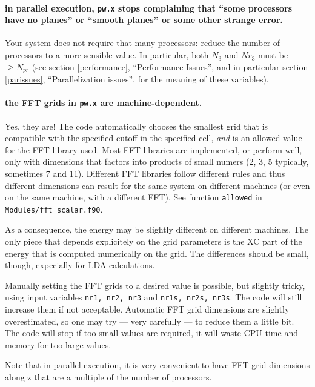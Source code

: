 \documentclass[12pt,a4paper]{article}
\begin{document}
\paragraph{in parallel execution, \texttt{pw.x} stops complaining that
           ``some processors have no planes'' or ``smooth planes'' or
           some other strange error.}

Your system does not require that many processors: reduce the number
of processors to a more sensible value.
In particular, both $N_3$ and $Nr_3$ must be $\geq N_{pr}$ (see
section \ref{performance}, ``Performance Issues'', and in particular
section \ref{parissues}, ``Parallelization issues'', for the meaning
of these variables).

\paragraph{the FFT grids in \texttt{pw.x} are machine-dependent.}

Yes, they are!
The code automatically chooses the smallest grid that is compatible
with the specified cutoff in the specified cell, \emph{and} is an
allowed value for the FFT library used.
Most FFT libraries are implemented, or perform well, only with
dimensions that factors into products of small numers (2, 3, 5
typically, sometimes 7 and 11).
Different FFT libraries follow different rules and thus different
dimensions can result for the same system on different machines (or
even on the same machine, with a different FFT).
See function \texttt{allowed} in \texttt{Modules/fft\_scalar.f90}.

As a consequence, the energy may be slightly different on different
machines.
The only piece that depends explicitely on the grid parameters is the
XC part of the energy that is computed numerically on the grid.
The differences should be small, though, expecially for LDA
calculations.

Manually setting the FFT grids to a desired value is possible, but
slightly tricky, using input variables \texttt{nr1, nr2, nr3} and
\texttt{nr1s, nr2s, nr3s}.
The code will still increase them if not acceptable.
Automatic FFT grid dimensions are slightly overestimated, so one may
try --- very carefully --- to reduce them a little bit.
The code will stop if too small values are required, it will waste CPU
time and memory for too large values.

Note that in parallel execution, it is very convenient to have FFT
grid dimensions along z that are a multiple of the number of
processors.
\end{document}
